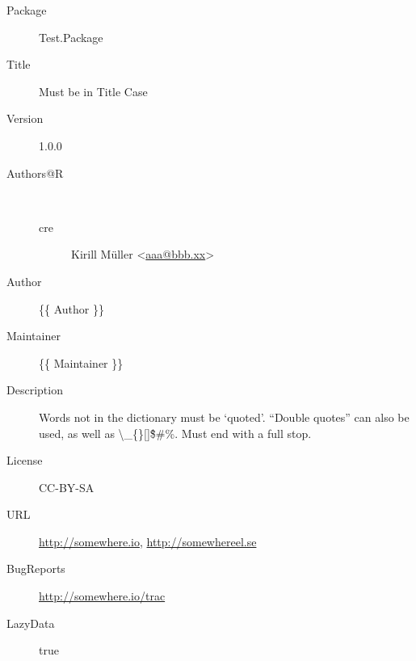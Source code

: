 \begin{description}
  \raggedright{}
  \item[Package] Test.Package
  \item[Title] Must be in Title Case
  \item[Version] 1.0.0
  \item[Authors@R] ~\\
    \begin{description}
      \item[cre] Kirill Müller <\href{mailto:aaa@bbb.xx}{aaa@bbb.xx}>
    \end{description}
  \item[Author] \{\{ Author \}\}
  \item[Maintainer] \{\{ Maintainer \}\}
  \item[Description] Words not in the dictionary must be `quoted'. ``Double quotes'' can also be used, as well as \textbackslash \_\{\}[]\^\$\#\%. Must end with a full stop.
  \item[License] CC-BY-SA
  \item[URL] \url{http://somewhere.io}, \url{http://somewhereel.se}
  \item[BugReports] \url{http://somewhere.io/trac}
  \item[LazyData] true
\end{description}
